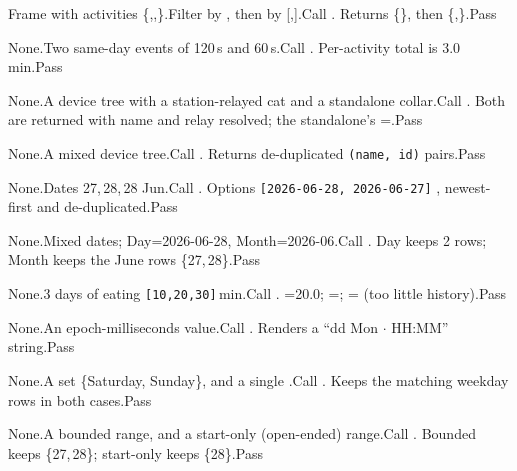 {Frame with activities \{,,\}.}{Filter by , then by [,].}{Call .}
{Returns \{\}, then \{,\}.}{Pass}

{None.}{Two same-day events of 120\,s and 60\,s.}{Call .}
{Per-activity total is 3.0\,min.}{Pass}

{None.}{A device tree with a station-relayed cat and a standalone collar.}{Call .}
{Both are returned with name and relay resolved; the standalone's =.}{Pass}

{None.}{A mixed device tree.}{Call .}
{Returns de-duplicated \texttt{(name, id)} pairs.}{Pass}

{None.}{Dates 27,\,28,\,28 Jun.}{Call .}
{Options \texttt{[2026-06-28, 2026-06-27]} , newest-first and de-duplicated.}{Pass}

{None.}{Mixed dates; Day=2026-06-28, Month=2026-06.}{Call .}
{Day keeps 2 rows; Month keeps the June rows \{27,\,28\}.}{Pass}

{None.}{3 days of eating \texttt{[10,20,30]}\,min.}{Call .}
{=20.0; =; = (too little history).}{Pass}

{None.}{An epoch-milliseconds value.}{Call .}
{Renders a ``dd Mon $\cdot$ HH:MM'' string.}{Pass}

{None.}{A set \{Saturday, Sunday\}, and a single .}{Call .}
{Keeps the matching weekday rows in both cases.}{Pass}

{None.}{A bounded range, and a start-only (open-ended) range.}{Call .}
{Bounded keeps \{27,\,28\}; start-only keeps \{28\}.}{Pass}


